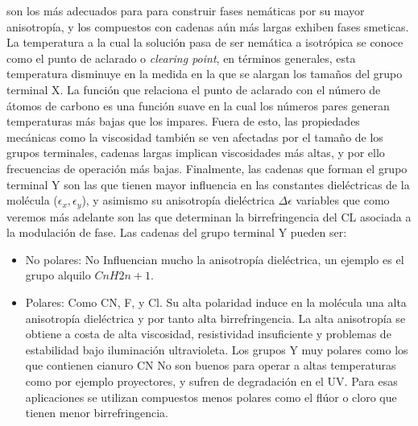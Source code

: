  son los más adecuados para para construir fases nemáticas por su
 mayor anisotropía, y los compuestos con cadenas aún más largas
 exhiben fases smeticas. La temperatura a la cual la solución pasa de
 ser nemática a isotrópica se conoce como el punto de aclarado o
 \textit{clearing point}, en términos generales, esta temperatura
 disminuye en la medida en la que se alargan los tamaños del 
 grupo terminal X. La función que relaciona el punto de aclarado con
 el número de átomos de carbono es una función suave en la cual los
 números pares generan temperaturas más bajas que los impares. Fuera
 de esto, las propiedades mecánicas como la viscosidad también se ven
 afectadas por el tamaño de los grupos terminales, cadenas
 largas implican viscosidades más altas, y por ello frecuencias de
 operación más bajas. 
Finalmente, las cadenas que forman el grupo terminal Y son las que
tienen mayor influencia en las constantes dieléctricas de la molécula
($\epsilon_x,\epsilon_y$), y asimismo su anisotropía dieléctrica
$\Delta\epsilon$ variables que como veremos más adelante son las que
determinan la birrefringencia del CL asociada a la modulación de fase.
Las cadenas del grupo terminal Y pueden ser:
\begin{itemize}
\item No polares: No Influencian mucho la anisotropía dieléctrica, un
  ejemplo es el grupo alquilo $CnH2n+1$.
\item Polares:  Como CN, F, y Cl. Su alta polaridad induce en la
  molécula una alta anisotropía dieléctrica y por tanto alta
  birrefringencia. La alta anisotropía se obtiene a costa de alta viscosidad, resistividad
  insuficiente y problemas de estabilidad bajo iluminación 
  ultravioleta. Los grupos Y muy polares como los que contienen
  cianuro CN No son buenos para operar a  altas temperaturas como por
  ejemplo proyectores, y sufren de degradación en el UV. Para esas
  aplicaciones se utilizan compuestos menos polares como el flúor o
  cloro que tienen menor birrefringencia.
\end{itemize}

